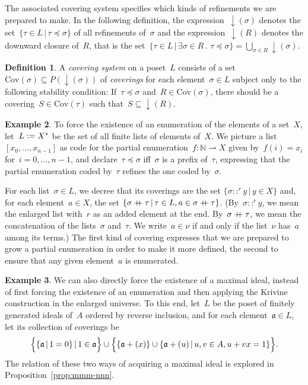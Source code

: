 \documentclass[com,11pt,crcready]{iosart2x}
\theoremstyle{definition}
\newtheorem{definition}{Definition}[section]
\newtheorem{example}[definition]{Example}
\theoremstyle{plain}
\theoremstyle{remark}
\newcommand{\aaa}{\mathfrak{a}}
\newcommand{\NN}{\mathbb{N}}
\newcommand{\defeq}{\vcentcolon=}
\newcommand{\Cov}{\mathrm{Cov}}
\newcommand{\concat}{\mathbin{{+}\mspace{-8mu}{+}}}
\renewcommand{\_}{\mathpunct{.}\,}
\begin{document}
The associated covering system specifies which kinds of refinements
we are prepared to make. In the following definition, the
expression~${\downarrow}(\sigma)$ denotes the set~$\{ \tau \in L \,|\, \tau
\preceq \sigma \}$ of all refinements of~$\sigma$ and the
expression~${\downarrow}(R)$ denotes the downward closure of~$R$, that is the
set~$\{ \tau \in L \,|\, \exists \sigma \in R\_ \tau \preceq \sigma \} =
\bigcup_{\sigma \in R} {\downarrow}(\sigma)$.

\begin{definition}\label{defn:covering-system}A \emph{covering system} on a
poset~$L$ consists of a set~$\Cov(\sigma) \subseteq P({\downarrow}(\sigma))$
of \emph{coverings} for each element~$\sigma \in L$ subject only to the
following stability condition:
If~$\tau \preceq \sigma$ and~$R \in \Cov(\sigma)$, there should be a
covering~$S \in \Cov(\tau)$ such that~$S \subseteq {\downarrow}(R)$.
\end{definition}

\begin{example}\label{ex:notion-enum}To force the existence of an enumeration
of the elements of a set~$X$, let~$L \defeq X^*$ be the set of all finite lists
of elements of~$X$. We picture a list~$[x_0,\ldots,x_{n-1}]$ as code for the
partial enumeration~$f : \NN \rightharpoonup X$ given by~$f(i) = x_i$
for~$i=0,\ldots,n-1$, and declare~$\tau \preceq \sigma$ iff~$\sigma$ is a prefix
of~$\tau$, expressing that the partial enumeration coded by~$\tau$ refines the
one coded by~$\sigma$.

For each list~$\sigma \in L$, we decree that its coverings are the set
$\{ \sigma ::^r y \,|\, y \in X \}$
and, for each element~$a \in X$, the set
$\{ \sigma \concat \tau \,|\, \tau \in L, a \in \sigma \concat \tau
\}$. (By~$\sigma ::^r y$, we mean the enlarged list with~$r$ as an
added element at the end. By~$\sigma \concat \tau$, we mean the concatenation
of the lists~$\sigma$ and~$\tau$. We write~$a \in \nu$ if and only if the
list~$\nu$ has~$a$ among its terms.)
The first kind of covering expresses that we are prepared to grow a partial
enumeration in order to make it more defined, the second to ensure
that any given element~$a$ is enumerated.
\end{example}

\begin{example}\label{ex:notion-max}We can also directly force the existence of a maximal ideal,
instead of first forcing the existence of an enumeration and then applying the
Krivine construction in the enlarged universe. To this end, let~$L$ be the
poset of finitely generated ideals of~$A$ ordered by reverse inclusion,
and for each element~$\aaa \in L$, let its collection of coverings be
\[\Bigl\{ \{ \aaa \,|\, 1 = 0 \} \,|\, 1 \in \aaa \Bigr\} \cup 
  \Bigl\{ \{ \aaa + (x) \} \cup \{ \aaa + (u) \,|\, u,v \in A, u + vx = 1 \} \Bigr\}.
\]
The relation of these two ways of acquiring a maximal ideal is explored in
Proposition~\ref{prop:mmm-nnn}.
\end{example}
\end{document}

